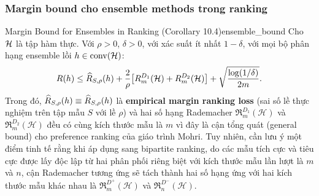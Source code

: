 \subsubsection{Margin bound cho ensemble methods trong ranking}

\begin{corollary}{Margin Bound for Ensembles in Ranking (Corollary 10.4)}{ensemble_bound}
Cho $\mathcal{H}$ là tập hàm thực. Với $\rho > 0$, $\delta > 0$, với xác suất ít nhất $1 - \delta$, với mọi bộ phân hạng ensemble lồi $h \in \operatorname{conv}(\mathcal{H})$:
\begin{equation}
    R(h) \leq \widehat{R}_{S,\rho}(h) + \frac{2}{\rho}\bigl[R^{D_1}_m(\mathcal{H}) + R^{D_2}_m(\mathcal{H})\bigr] + \sqrt{\frac{\log(1/\delta)}{2m}}.
    \label{eq:ensemble_bound_formula}
\end{equation}
Trong đó, $\widehat{R}_{S,\rho}(h) \equiv \widehat{R}_{S,\rho}(h)$ là \textbf{empirical margin ranking loss} (sai số lề thực nghiệm trên tập mẫu $S$ với lề $\rho$) và hai số hạng Rademacher $\mathfrak{R}_m^{D_1}(\mathcal{H})$ và $\mathfrak{R}_m^{D_2}(\mathcal{H})$ đều có cùng kích thước mẫu là $m$ vì đây là cận tổng quát (general bound) cho preference ranking của giáo trình Mohri. Tuy nhiên, cần lưu ý một điểm tinh tế rằng khi áp dụng sang bipartite ranking, do các mẫu tích cực và tiêu cực được lấy độc lập từ hai phân phối riêng biệt với kích thước mẫu lần lượt là $m$ và $n$, cận Rademacher tương ứng sẽ tách thành hai số hạng ứng với hai kích thước mẫu khác nhau là $\mathfrak{R}_m^{D^+}(\mathcal{H})$ và $\mathfrak{R}_n^{D^-}(\mathcal{H})$.
\end{corollary}

